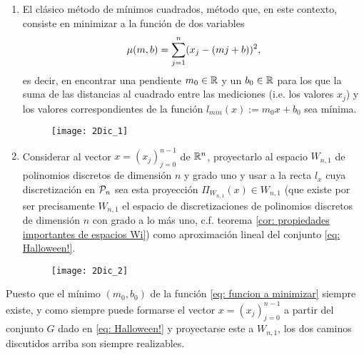 \begin{enumerate}
\item El clásico método de
mínimos cuadrados, método que, en este contexto,
consiste en minimizar a la función
de dos variables 
\begin{equation}
\label{eq: funcion a minimizar}
\mu (m,b)= \sum\limits_{j=1}^{n}(x_{j}-(mj+b))^{2},
\end{equation}
es decir, en encontrar una pendiente
$m_{0} \in \mathbb{R}$ y un $b_{0} \in \mathbb{R}$ 
para los que la suma de las distancias
al cuadrado entre las mediciones 
(i.e. los valores $x_{j}$)
y los valores correspondientes de la función
$l_{min}(x):=m_{0}x+b_{0}$
sea mínima. 


\begin{figure}[H]
	\centering
	\texttt{[image: 2Dic\_1]} 
\end{figure}	


\item Considerar al vector $x=(x_{j})_{j=0}^{n-1}$
de $\mathbb{R}^{n}$, proyectarlo al espacio $W_{n,1}$ 
de polinomios discretos de dimensión $n$ y grado uno
y usar
a la recta $l_{x}$ cuya discretización en 
$\mathcal{P}_{n}$ sea esta proyección
$\Pi_{W_{n,1}}(x) \in W_{n,1}$ 
(que existe por ser precisamente
$W_{n,1}$ el espacio de discretizaciones
de polinomios discretos de dimensión $n$ con
grado a lo más uno, c.f. 
teorema \ref{cor: propiedades importantes de espacios Wi})
como aproximación lineal del conjunto \eqref{eq: Halloween!}.


\begin{figure}[H]
	\centering
	\texttt{[image: 2Dic\_2]} 
\end{figure}	

\end{enumerate}


Puesto que el mínimo 
$(m_{0}, b_{0})$ de la función 
\eqref{eq: funcion a minimizar} siempre existe,
y como siempre puede formarse el vector
$x=(x_{j})_{j=0}^{n-1}$ a partir del conjunto $G$
dado en \eqref{eq: Halloween!} 
y proyectarse este
a $W_{n,1}$, los dos caminos discutidos arriba
son siempre realizables.


